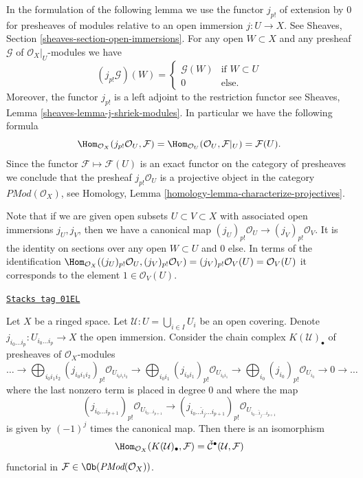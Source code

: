 In the formulation of the following lemma we use the functor $j_{p!}$ of
extension by $0$ for presheaves of modules
relative to an open immersion $j : U \to X$.
See Sheaves, Section \ref{sheaves-section-open-immersions}. For any open
$W \subset X$ and any presheaf $\mathcal{G}$ of $\mathcal{O}_X|_U$-modules
we have
$$
(j_{p!}\mathcal{G})(W) =
\left\{
\begin{matrix}
\mathcal{G}(W) & \text{if } W \subset U \\
0 & \text{else.}
\end{matrix}
\right.
$$
Moreover, the functor $j_{p!}$ is a left adjoint to the restriction functor
see Sheaves, Lemma \ref{sheaves-lemma-j-shriek-modules}.
In particular we have the following formula
$$
\Hom_{\mathcal{O}_X}(j_{p!}\mathcal{O}_U, \mathcal{F})
=
\Hom_{\mathcal{O}_U}(\mathcal{O}_U, \mathcal{F}|_U)
=
\mathcal{F}(U).
$$
Since the functor $\mathcal{F} \mapsto \mathcal{F}(U)$ is an exact functor
on the category of presheaves we conclude that the presheaf
$j_{p!}\mathcal{O}_U$ is a projective object in the category
$\textit{PMod}(\mathcal{O}_X)$, see
Homology, Lemma \ref{homology-lemma-characterize-projectives}.

\medskip\noindent
Note that if we are given open subsets $U \subset V \subset X$
with associated open immersions $j_U, j_V$, then we have a canonical
map $(j_U)_{p!}\mathcal{O}_U \to (j_V)_{p!}\mathcal{O}_V$. It is the
identity on sections over any open $W \subset U$ and $0$ else.
In terms of the identification
$\Hom_{\mathcal{O}_X}((j_U)_{p!}\mathcal{O}_U, (j_V)_{p!}\mathcal{O}_V) =
(j_V)_{p!}\mathcal{O}_V(U) = \mathcal{O}_V(U)$ it corresponds to
the element $1 \in \mathcal{O}_V(U)$.

\begin{lemma}
\label{cohomology-lemma-cech-map-into}
\href{https://stacks.math.columbia.edu/tag/01EL}{\texttt{Stacks tag 01EL}}

Let $X$ be a ringed space.
Let $\mathcal{U} : U = \bigcup_{i \in I} U_i$ be an open covering.
Denote $j_{i_0\ldots i_p} : U_{i_0 \ldots i_p} \to X$ the open immersion.
Consider the chain complex $K(\mathcal{U})_\bullet$
of presheaves of $\mathcal{O}_X$-modules
$$
\ldots
\to
\bigoplus_{i_0i_1i_2} (j_{i_0i_1i_2})_{p!}\mathcal{O}_{U_{i_0i_1i_2}}
\to
\bigoplus_{i_0i_1} (j_{i_0i_1})_{p!}\mathcal{O}_{U_{i_0i_1}}
\to
\bigoplus_{i_0} (j_{i_0})_{p!}\mathcal{O}_{U_{i_0}}
\to 0 \to \ldots
$$
where the last nonzero term is placed in degree $0$
and where the map
$$
(j_{i_0\ldots i_{p + 1}})_{p!}\mathcal{O}_{U_{i_0\ldots i_{p + 1}}}
\longrightarrow
(j_{i_0\ldots \hat i_j \ldots i_{p + 1}})_{p!}
\mathcal{O}_{U_{i_0\ldots \hat i_j \ldots i_{p + 1}}}
$$
is given by $(-1)^j$ times the canonical map.
Then there is an isomorphism
$$
\Hom_{\mathcal{O}_X}(K(\mathcal{U})_\bullet, \mathcal{F})
=
\check{\mathcal{C}}^\bullet(\mathcal{U}, \mathcal{F})
$$
functorial in $\mathcal{F} \in \Ob(\textit{PMod}(\mathcal{O}_X))$.
\end{lemma}

